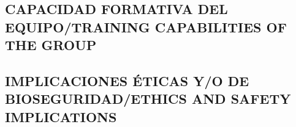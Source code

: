 \documentclass[a4paper,11pt,oneside]{article}
\begin{document}
\subsection{\sc CAPACIDAD FORMATIVA DEL EQUIPO/TRAINING CAPABILITIES OF THE GROUP}

%
%
%
%

\subsection{\sc IMPLICACIONES ÉTICAS Y/O DE BIOSEGURIDAD/ETHICS AND SAFETY IMPLICATIONS}
\end{document}
